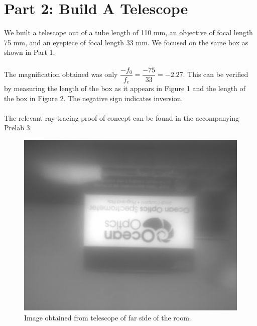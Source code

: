 \documentclass[10pt,a4paper]{article}
\begin{document}
\section*{Part 2: Build A Telescope}
We built a telescope out of a tube length of 110 mm, an objective of focal length 75 mm, and an eyepiece of focal length 33 mm. We focused on the same box as shown in Part 1.\\
\\
The magnification obtained was only $\dfrac{-f_{0}}{f_{e}} = \dfrac{-75}{33} = -2.27$. This can be verified by measuring the length of the box as it appears in Figure 1 and the length of the box in Figure 2. The negative sign indicates inversion.\\
\\
The relevant ray-tracing proof of concept can be found in the accompanying Prelab 3.
\begin{figure}[h]
\includegraphics[width=\textwidth]{../Analysis/Part2.png}
\caption{Image obtained from telescope of far side of the room.} 
\end{figure}
\end{document}
